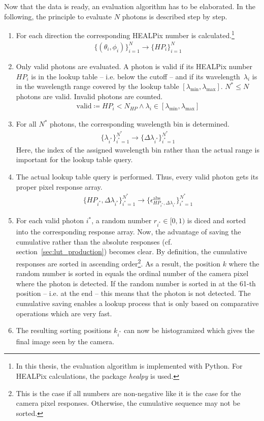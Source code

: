 Now that the data is ready, an evaluation algorithm has to be elaborated. In the following, the principle to evaluate $N$ photons is described step by step.

\begin{enumerate}
	\item For each direction the corresponding HEALPix number is calculated.\footnote{In this thesis, the evaluation algorithm is implemented with Python. For HEALPix calculations, the package \textit{healpy} is used.}
	\begin{align}
		\{(\theta_i, \phi_i)\}_{i=1}^N \rightarrow \{HP_i\}_{i=1}^N
	\end{align}
	\item Only valid photons are evaluated. A photon is valid if its HEALPix number~$HP_i$ is in the lookup table -- i.e. below the cutoff -- and if its wavelength~$\lambda_i$ is in the wavelength range covered by the lookup table $[\lambda_\text{min},\lambda_\text{max}]$. $N^\ast\leq N$ photons are valid. Invalid photons are counted.
	\begin{align}
		\text{valid} \coloneqq HP_i < N_{HP} \wedge \lambda_i \in [\lambda_\text{min},\lambda_\text{max}]
	\end{align} 
	\item For all $N^\ast$ photons, the corresponding wavelength bin is determined.
	\begin{align}
		\{\lambda_{i^\ast}\}_{i^\ast=1}^{N^\ast} \rightarrow \{ \Delta\lambda_{i^\ast} \}_{i^\ast=1}^{N^\ast}
	\end{align}
	Here, the index of the assigned wavelength bin rather than the actual range is important for the lookup table query.
	\item The actual lookup table query is performed. Thus, every valid photon gets its proper pixel response array.
	\begin{align}
		\{HP_{i^\ast}, \Delta\lambda_{i^\ast}\}_{i^\ast=1}^{N^\ast} \rightarrow \{ \epsilon^\text{abs}_{HP_{i^\ast},\Delta\lambda_{i^\ast}}\}_{i^\ast=1}^{N^\ast}
	\end{align}
	\item For each valid photon $i^\ast$, a random number $r_{i^\ast}\in[0,1)$ is diced and sorted into the corresponding response array. Now, the advantage of saving the cumulative rather than the absolute responses (cf. section~\ref{sec:lut_production}) becomes clear. By definition, the cumulative responses are sorted in ascending order\footnote{This is the case if all numbers are non-negative like it is the case for the camera pixel responses. Otherwise, the cumulative sequence may not be sorted.}. As a result, the position $k$ where the random number is sorted in equals the ordinal number of the camera pixel where the photon is detected. If the random number is sorted in at the \num{61}-th position -- i.e. at the end -- this means that the photon is not detected. The cumulative saving enables a lookup process that is only based on comparative operations which are very fast.
	\item The resulting sorting positions $k_{i^\ast}$ can now be histogramized which gives the final image seen by the camera.
\end{enumerate}

